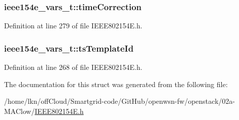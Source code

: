 \subsubsection[{\texorpdfstring{time\+Correction}{timeCorrection}}]{ ieee154e\+\_\+vars\+\_\+t\+::time\+Correction}\hypertarget{structieee154e__vars__t_a0da028e62f874bda0e754dfb66496e22}{}\label{structieee154e__vars__t_a0da028e62f874bda0e754dfb66496e22}


Definition at line 279 of file I\+E\+E\+E802154\+E.\+h.

\subsubsection[{\texorpdfstring{ts\+Template\+Id}{tsTemplateId}}]{ ieee154e\+\_\+vars\+\_\+t\+::ts\+Template\+Id}\hypertarget{structieee154e__vars__t_a73905d34d7732a5f7e30a648f48f605d}{}\label{structieee154e__vars__t_a73905d34d7732a5f7e30a648f48f605d}


Definition at line 268 of file I\+E\+E\+E802154\+E.\+h.



The documentation for this struct was generated from the following file\+:\begin{DoxyCompactItemize}
\item 
/home/lkn/off\+Cloud/\+Smartgrid-\/code/\+Git\+Hub/openwsn-\/fw/openstack/02a-\/\+M\+A\+Clow/\hyperlink{_i_e_e_e802154_e_8h}{I\+E\+E\+E802154\+E.\+h}\end{DoxyCompactItemize}

